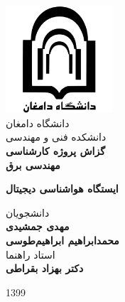 \begin{titlepage}
	\begin{center}
		\includegraphics[width=0.3\textwidth]{Assets/logo.pdf}\\
		\smallskip \LARGE
		{دانشگاه دامغان}\\
		{دانشکده فنی و ‌مهندسی}\\
	
		\vspace{1cm} \LARGE
		\textbf{گزاش پروژه کارشناسی\\مهندسی برق}\\
		
		\vspace{1cm}
		
		\huge
		\textbf{ایستگاه هواشناسی دیجیتال}
		
		\LARGE
		\vspace{3cm}
		{دانشجویان}\\
		\vspace{0.25cm}
		\textbf{مهدی ‌جمشیدی\\محمد‌ابراهیم ابراهیم‌طوسی}\\
	
		\vspace{1.2cm}
		{استاد راهنما}\\
		\vspace{0.25cm}
		\textbf{دکتر بهزاد بقراطی}
		
		\vfill
		{1399}
	\end{center}
\end{titlepage}